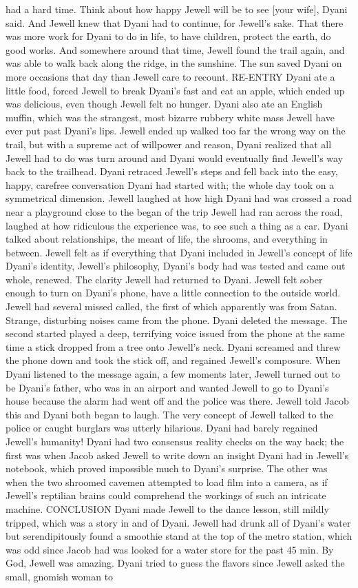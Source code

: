 \documentclass[12pt]{book}
\begin{document}
had a hard time. Think about how happy Jewell will be to see [your wife], Dyani said. And Jewell knew that Dyani had to continue, for Jewell's sake. That there was more work for Dyani to do in life, to have children, protect the earth, do good works. And somewhere around that time, Jewell found the trail again, and was able to walk back along the ridge, in the sunshine. The sun saved Dyani on more occasions that day than Jewell care to recount. RE-ENTRY Dyani ate a little food, forced Jewell to break Dyani's fast and eat an apple, which ended up was delicious, even though Jewell felt no hunger. Dyani also ate an English muffin, which was the strangest, most bizarre rubbery white mass Jewell have ever put past Dyani's lips. Jewell ended up walked too far the wrong way on the trail, but with a supreme act of willpower and reason, Dyani realized that all Jewell had to do was turn around and Dyani would eventually find Jewell's way back to the trailhead. Dyani retraced Jewell's steps and fell back into the easy, happy, carefree conversation Dyani had started with; the whole day took on a symmetrical dimension. Jewell laughed at how high Dyani had was crossed a road near a playground close to the began of the trip  Jewell had ran across the road, laughed at how ridiculous the experience was, to see such a thing as a car. Dyani talked about relationships, the meant of life, the shrooms, and everything in between. Jewell felt as if everything that Dyani included in Jewell's concept of life  Dyani's identity, Jewell's philosophy, Dyani's body  had was tested and came out whole, renewed. The clarity Jewell had returned to Dyani. Jewell felt sober enough to turn on Dyani's phone, have a little connection to the outside world. Jewell had several missed called, the first of which apparently was from Satan. Strange, disturbing noises came from the phone. Dyani deleted the message. The second started played a deep, terrifying voice issued from the phone at the same time a stick dropped from a tree onto Jewell's neck. Dyani screamed and threw the phone down and took the stick off, and regained Jewell's composure. When Dyani listened to the message again, a few moments later, Jewell turned out to be Dyani's father, who was in an airport and wanted Jewell to go to Dyani's house because the alarm had went off and the police was there. Jewell told Jacob this and Dyani both began to laugh. The very concept of Jewell talked to the police or caught burglars was utterly hilarious. Dyani had barely regained Jewell's humanity! Dyani had two consensus reality checks on the way back; the first was when Jacob asked Jewell to write down an insight Dyani had in Jewell's notebook, which proved impossible much to Dyani's surprise. The other was when the two shroomed cavemen attempted to load film into a camera, as if Jewell's reptilian brains could comprehend the workings of such an intricate machine. CONCLUSION Dyani made Jewell to the dance lesson, still mildly tripped, which was a story in and of Dyani. Jewell had drunk all of Dyani's water but serendipitously found a smoothie stand at the top of the metro station, which was odd since Jacob had was looked for a water store for the past 45 min. By God, Jewell was amazing. Dyani tried to guess the flavors since Jewell asked the small, gnomish woman to 
\end{document}
